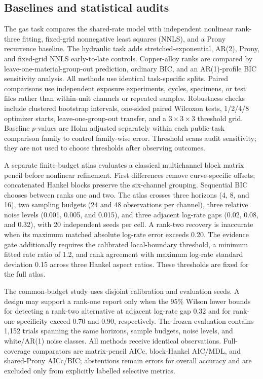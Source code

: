 \documentclass[11pt]{article}
\begin{document}
\subsection{Baselines and statistical audits}
The gas task compares the shared-rate model with independent nonlinear rank-three fitting, fixed-grid nonnegative least squares (NNLS), and a Prony recurrence baseline. The hydraulic task adds stretched-exponential, AR(2), Prony, and fixed-grid NNLS early-to-late controls. Copper-alloy ranks are compared by leave-one-material-group-out prediction, ordinary BIC, and an AR(1)-profile BIC sensitivity analysis. All methods use identical task-specific splits. Paired comparisons use independent exposure experiments, cycles, specimens, or test files rather than within-unit channels or repeated samples. Robustness checks include clustered bootstrap intervals, one-sided paired Wilcoxon tests, 1/2/4/8 optimizer starts, leave-one-group-out transfer, and a $3\times3\times3$ threshold grid. Baseline $p$-values are Holm adjusted separately within each public-task comparison family to control family-wise error. Threshold scans audit sensitivity; they are not used to choose thresholds after observing outcomes.

A separate finite-budget atlas evaluates a classical multichannel block matrix pencil before nonlinear refinement. First differences remove curve-specific offsets; concatenated Hankel blocks preserve the six-channel grouping. Sequential BIC chooses between ranks one and two. The atlas crosses three horizons (4, 8, and 16), two sampling budgets (24 and 48 observations per channel), three relative noise levels (0.001, 0.005, and 0.015), and three adjacent log-rate gaps (0.02, 0.08, and 0.32), with 20 independent seeds per cell. A rank-two recovery is inaccurate when its maximum matched absolute log-rate error exceeds 0.20. The evidence gate additionally requires the calibrated local-boundary threshold, a minimum fitted rate ratio of 1.2, and rank agreement with maximum log-rate standard deviation 0.15 across three Hankel aspect ratios. These thresholds are fixed for the full atlas.

The common-budget study uses disjoint calibration and evaluation seeds. A design may support a rank-one report only when the 95\% Wilson lower bounds for detecting a rank-two alternative at adjacent log-rate gap 0.32 and for rank-one specificity exceed 0.70 and 0.90, respectively. The frozen evaluation contains 1,152 trials spanning the same horizons, sample budgets, noise levels, and white/AR(1) noise classes. All methods receive identical observations. Full-coverage comparators are matrix-pencil AICc, block-Hankel AIC/MDL, and shared-Prony AICc/BIC; abstentions remain errors for overall accuracy and are excluded only from explicitly labelled selective metrics.
\end{document}
